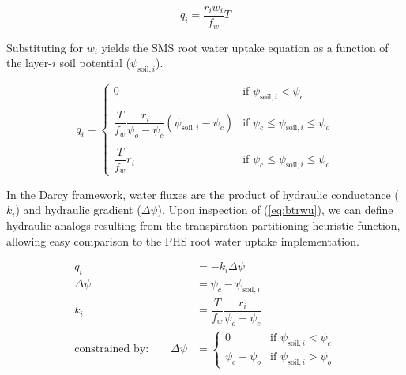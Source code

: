 \documentclass[draft,linenumbers]{agujournal}
\begin{document}
    \begin{linenomath*}
    \begin{equation}
    \label{bt:4}
    q_i = \dfrac{r_i w_i}{f_w}T
    \end{equation}
    \end{linenomath*}
    
    Substituting for $w_i$ yields the SMS root water uptake equation as a function of the layer-$i$ soil potential ($\psi_{\text{soil},i}$).
    
    \begin{linenomath*}
    \begin{equation}
    q_i =
    \begin{cases}
    \label{eq:btrwu}
    0    & \text{if } \psi_{\text{soil},i}<\psi_{c}  \\
    \\[1pt]
        \dfrac{T}{f_w} \dfrac{r_i}{\psi_{o}-\psi_{c}} \left(\psi_{\text{soil},i}-\psi_{c} \right)     & \text{if } \psi_{c} \le \psi_{\text{soil},i} \le \psi_{o} \\
    \\[1pt]
    \dfrac{T}{f_w} r_i    & \text{if } \psi_{c} \le \psi_{\text{soil},i} \le \psi_{o}
    \end{cases}
    \end{equation}
    \end{linenomath*}
    
    In the Darcy framework, water fluxes are the product of hydraulic conductance ($k_i$) and hydraulic gradient ($\Delta\psi$).
    Upon inspection of (\ref{eq:btrwu}), we can define hydraulic analogs resulting from the transpiration partitioning heuristic function, 
    allowing easy comparison to the PHS root water uptake implementation.
    
    \begin{linenomath*}
    \begin{equation} \begin{aligned}
    q_i &= -k_i\Delta\psi \\
    \Delta\psi &=  \psi_{c}-\psi_{\text{soil},i} \\
    k_i &= \dfrac{T}{f_w} \dfrac{r_i}{\psi_{o}-\psi_{c}} \\
    \mbox{constrained by:} \qquad
    \Delta\psi &=
    \begin{cases}
    0                          & \text{if } \psi_{\text{soil},i}<\psi_{c}  \\
    \psi_{c}-\psi_{o} & \text{if } \psi_{\text{soil},i}>\psi_{o}
    \label{kb}
    \end{cases}
    \end{aligned}\end{equation}
    \end{linenomath*}
    
\end{document}

